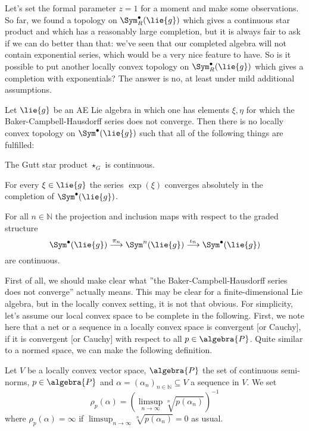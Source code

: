 Let's set the formal parameter $z = 1$ for a moment and make some 
observations. So far, we found a topology on $\Sym_R^{\bullet}(\lie{g})$ which 
gives a continuous star product and which has a reasonably large completion, 
but it is always fair to ask if we can do better than that: we've seen that 
our completed algebra will not contain exponential series, which would be a 
very nice feature to have. So is it possible to put another locally convex 
topology on $\Sym_R^{\bullet}(\lie{g})$ which gives a completion with 
exponentials? The answer is no, at least under mild additional assumptions. 
\begin{proposition}
	\label{LCAna:Prop:NoBetterTopology}
	Let $\lie{g}$ be an AE Lie algebra in which one has elements $\xi, \eta$ 
	for which the Baker-Campbell-Hausdorff series does not converge. 
	Then there is no locally convex topology on $\Sym^{\bullet}(\lie{g})$ 
	such that all of the following things are fulfilled:
	\begin{propositionlist}
		\item
		The Gutt star product $\star_G$ is continuous.
		\item
		For every $\xi \in \lie{g}$ the series $\exp(\xi)$ converges 
		absolutely in the completion of $\Sym^{\bullet}(\lie{g})$.
		\item
		For all $n \in \mathbb{N}$ the projection and inclusion maps with 
		respect to the graded structure
		\begin{equation*}
			\Sym^{\bullet}(\lie{g})
	    		\ot{$\pi_n$}{\longrightarrow}
    	    		\Sym^n(\lie{g})
	    	    	\ot{$\iota_n$}{\longrightarrow}
	    		\Sym^{\bullet}(\lie{g})
		\end{equation*}
		are continuous.
	\end{propositionlist}
\end{proposition}
First of all, we should make clear what ''the Baker-Campbell-Hausdorff series 
does not converge'' actually means. This may be clear for a finite-dimensional 
Lie algebra, but in the locally convex setting, it is not that obvious. For 
simplicity, let's assume our local convex space to be complete in the 
following. First, we note here that a net or a sequence in a locally convex 
space is  convergent [or Cauchy], if it is convergent [or Cauchy] with respect 
to all $p \in \algebra{P}$. Quite similar to a normed space, we can make the 
following definition.
\begin{definition}
	\label{Def:RadiusOfConvergenceLCS}
	Let $V$ be a locally convex vector space, $\algebra{P}$ the set of 
	continuous semi-norms, $p \in \algebra{P}$ and 
	$\alpha = (\alpha_n)_{n \in \mathbb{N}}\subseteq V$ a sequence in $V$. 
	We set
	\begin{equation*}
		\rho_p(\alpha)
		=
		\left(
			\limsup_{n \longrightarrow \infty}
			\sqrt[n]{p \left(\alpha_n \right)}
		\right)^{-1}
	\end{equation*}
	where $\rho_p(\alpha) = \infty$ if $\limsup_{n \longrightarrow \infty} 
	\sqrt[n]{p \left(\alpha_n \right)} = 0$ as usual.
\end{definition}
